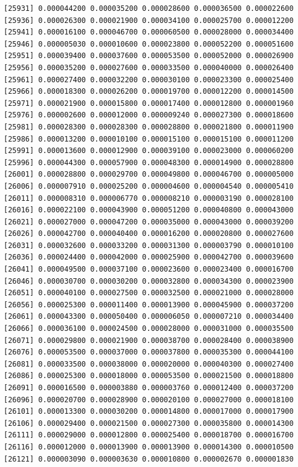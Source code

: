 \documentclass[]{article}
\begin{document}
\begin{verbatim}
[25931] 0.000044200 0.000035200 0.000028600 0.000036500 0.000022600
[25936] 0.000026300 0.000021900 0.000034100 0.000025700 0.000012200
[25941] 0.000016100 0.000046700 0.000060500 0.000028000 0.000034400
[25946] 0.000005030 0.000010600 0.000023800 0.000052200 0.000051600
[25951] 0.000039400 0.000037600 0.000053500 0.000052000 0.000026900
[25956] 0.000035200 0.000027600 0.000033500 0.000040000 0.000026400
[25961] 0.000027400 0.000032200 0.000030100 0.000023300 0.000025400
[25966] 0.000018300 0.000026200 0.000019700 0.000012200 0.000014500
[25971] 0.000021900 0.000015800 0.000017400 0.000012800 0.000001960
[25976] 0.000002600 0.000012000 0.000009240 0.000027300 0.000018600
[25981] 0.000028300 0.000028300 0.000028800 0.000021800 0.000011900
[25986] 0.000013200 0.000010100 0.000015100 0.000015100 0.000011200
[25991] 0.000013600 0.000012900 0.000039100 0.000023000 0.000060200
[25996] 0.000044300 0.000057900 0.000048300 0.000014900 0.000028800
[26001] 0.000028800 0.000029700 0.000049800 0.000046700 0.000005000
[26006] 0.000007910 0.000025200 0.000004600 0.000004540 0.000005410
[26011] 0.000008310 0.000006770 0.000008210 0.000003190 0.000028100
[26016] 0.000022100 0.000043900 0.000051200 0.000040800 0.000043000
[26021] 0.000027000 0.000047200 0.000035000 0.000043000 0.000039200
[26026] 0.000042700 0.000040400 0.000016200 0.000020800 0.000027600
[26031] 0.000032600 0.000033200 0.000031300 0.000003790 0.000010100
[26036] 0.000024400 0.000042000 0.000025900 0.000042700 0.000039600
[26041] 0.000049500 0.000037100 0.000023600 0.000023400 0.000016700
[26046] 0.000030700 0.000030200 0.000032800 0.000034300 0.000023900
[26051] 0.000040100 0.000027500 0.000032500 0.000021000 0.000028000
[26056] 0.000025300 0.000011400 0.000013900 0.000045900 0.000037200
[26061] 0.000043300 0.000050400 0.000006050 0.000007210 0.000034400
[26066] 0.000036100 0.000024500 0.000028000 0.000031000 0.000035500
[26071] 0.000029800 0.000021900 0.000038700 0.000028400 0.000038900
[26076] 0.000053500 0.000037000 0.000037800 0.000035300 0.000044100
[26081] 0.000033500 0.000038000 0.000020000 0.000040300 0.000027400
[26086] 0.000025300 0.000018000 0.000053500 0.000021500 0.000018800
[26091] 0.000016500 0.000003880 0.000003760 0.000012400 0.000037200
[26096] 0.000020700 0.000028900 0.000020100 0.000027000 0.000018100
[26101] 0.000013300 0.000030200 0.000014800 0.000017000 0.000017900
[26106] 0.000029400 0.000021500 0.000027300 0.000035800 0.000014300
[26111] 0.000029000 0.000012800 0.000025400 0.000018700 0.000016700
[26116] 0.000012000 0.000013900 0.000013900 0.000014300 0.000010500
[26121] 0.000003090 0.000003630 0.000010800 0.000002670 0.000001830

\end{verbatim}
\end{document}
